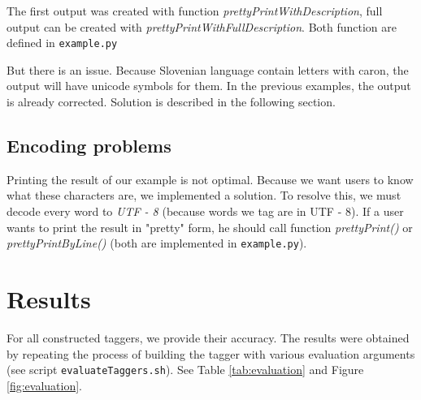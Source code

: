 \documentclass[10pt, conference, compsocconf]{IEEEtran}
\begin{document}
The first output was created with function \textit{prettyPrintWithDescription}, full output can be created with \textit{prettyPrintWithFullDescription}. Both function are defined in \texttt{example.py}
\par
But there is an issue. Because Slovenian language contain letters with caron, the output will have unicode symbols for them. In the previous examples, the output is already corrected. Solution is described in the following section. 

\subsection{Encoding problems} %
Printing the result of our example is not optimal. Because we want users to know what these characters are, we implemented a solution. To resolve this, we must decode every word to \textit{UTF - 8} (because words we tag are in UTF - 8). If a user wants to print the result in "pretty" form, he should call function \textit{prettyPrint()} or \textit{prettyPrintByLine()} (both are implemented in \texttt{example.py}).

\section{Results} %
\label{results}
For all constructed taggers, we provide their accuracy. The results were obtained by repeating the process of building the tagger with various evaluation arguments (see script \texttt{evaluateTaggers.sh}). See Table \ref{tab:evaluation} and Figure \ref{fig:evaluation}.
\end{document}
